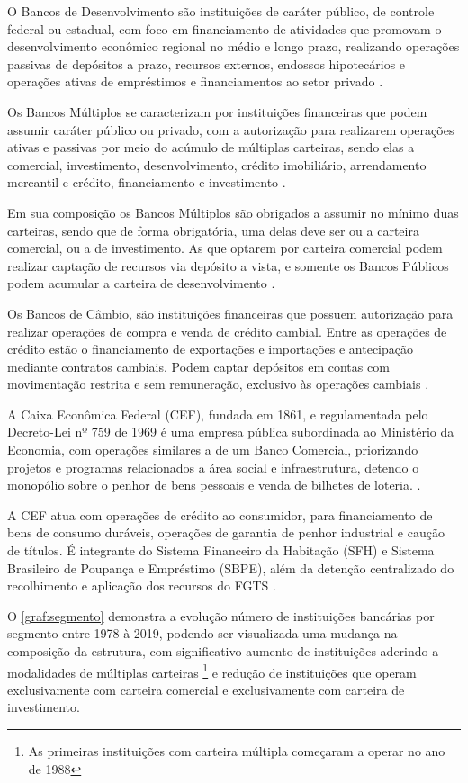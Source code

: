 \documentclass[
  12pt,
  12pt,
  openright,
  oneside,
  a4paper,
  chapter=TITLE,
  section=TITLE,
  subsection=TITLE,
  subsubsection=TITLE,
  english,
  portugues,
  sumario=tradicional]{abntex2}
\begin{document}
O Bancos de Desenvolvimento são instituições de caráter público, de controle federal ou estadual, com foco em financiamento de atividades que promovam o desenvolvimento econômico regional no médio e longo prazo, realizando operações passivas de depósitos a prazo, recursos externos, endossos hipotecários e operações ativas de empréstimos e financiamentos ao setor privado \cite{Res:394:1976}.

Os Bancos Múltiplos se caracterizam por instituições financeiras que podem assumir caráter público ou privado, com a autorização para realizarem operações ativas e passivas por meio do acúmulo de múltiplas carteiras, sendo elas a comercial, investimento, desenvolvimento, crédito imobiliário, arrendamento mercantil e crédito, financiamento e investimento \cite{Res:2099:1994}.

Em sua composição os Bancos Múltiplos são obrigados a assumir no mínimo duas carteiras, sendo que de forma obrigatória, uma delas deve ser ou a carteira comercial, ou a de investimento. As que optarem por carteira comercial podem realizar captação de recursos via depósito a vista, e somente os Bancos Públicos podem acumular a carteira de desenvolvimento \cite{Res:2099:1994}.

Os Bancos de Câmbio, são instituições financeiras que possuem autorização para realizar operações de compra e venda de crédito cambial. Entre as operações de crédito estão o financiamento de exportações e importações e antecipação mediante contratos cambiais. Podem captar depósitos em contas com movimentação restrita e sem remuneração, exclusivo às operações cambiais \cite{Res:3426:2006}.

A Caixa Econômica Federal (CEF), fundada em 1861, e regulamentada pelo Decreto-Lei nº 759 de 1969 é uma empresa pública subordinada ao Ministério da Economia, com operações similares a de um Banco Comercial, priorizando projetos e programas relacionados a área social e infraestrutura, detendo o monopólio sobre o penhor de bens pessoais e venda de bilhetes de loteria. \cite{DL:759:1969}.

A CEF atua com operações de crédito ao consumidor, para financiamento de bens
de consumo duráveis, operações de garantia de penhor industrial e caução de
títulos. É integrante do Sistema Financeiro da Habitação (SFH) e Sistema
Brasileiro de Poupança e Empréstimo (SBPE), além da detenção centralizado do recolhimento e aplicação dos recursos do FGTS \cite{DL:759:1969}.

O \autoref{graf:segmento} demonstra a evolução número de instituições bancárias por segmento entre 1978 à 2019, podendo ser visualizada uma mudança na composição da estrutura, com significativo aumento de instituições aderindo a modalidades de múltiplas carteiras \footnote{As primeiras instituições com carteira múltipla começaram a operar no ano de 1988} e redução de instituições que operam exclusivamente com carteira comercial e exclusivamente com carteira
de investimento.
\end{document}
